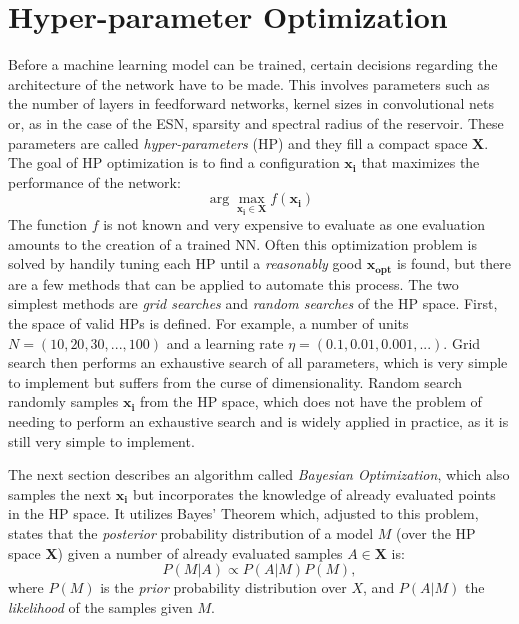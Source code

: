 \section{Hyper-parameter Optimization}%
\label{sec:hyper_parameter_optimization}

Before a machine learning model can be trained, certain decisions regarding the
architecture of the network have to be made. This involves parameters such as
the number of layers in feedforward networks, kernel sizes in
convolutional nets or, as in the case of the ESN, sparsity and spectral radius
of the reservoir.  These parameters are called \emph{hyper-parameters} (HP) and
they fill a compact space $\mathbf{X}$.  The goal of HP optimization is to find
a configuration $\mathbf{x_i}$ that maximizes the performance of the network:
\begin{equation}
  \arg \max_{\mathbf{x_i} \in \mathbf{X}} f(\mathbf{x_i})
\end{equation}
The function $f$ is not known and very expensive to evaluate as one evaluation
amounts to the creation of a trained NN.  Often this optimization problem is
solved by handily tuning each HP until a \emph{reasonably} good
$\mathbf{x_{\text{opt}}}$ is found, but there are a few methods that can be
applied to automate this process.  The two simplest methods are \emph{grid
searches} and \emph{random searches} of the HP space.  First, the space of
valid HPs is defined.  For example, a number of units $N = (10, 20, 30,...,
100)$ and a learning rate $\eta = (0.1, 0.01, 0.001, ...)$. Grid search then
performs an exhaustive search of all parameters, which is very simple to
implement but suffers from the curse of dimensionality.  Random search randomly
samples $\mathbf{x_i}$ from the HP space, which does not have the problem of
needing to perform an exhaustive search and is widely applied in practice, as
it is still very simple to implement.

The next section describes an algorithm called \emph{Bayesian Optimization},
which also samples the next $\mathbf{x_i}$ but incorporates the knowledge of
already evaluated points in the HP space.  It utilizes Bayes' Theorem which,
adjusted to this problem, states that the \emph{posterior} probability
distribution of a model $M$ (over the HP space $\mathbf{X}$) given a number of
already evaluated samples $A \in \mathbf{X}$ is:
\begin{equation}
  P(M|A) \propto P(A|M) P(M),
\end{equation}
where $P(M)$ is the \emph{prior} probability distribution over $X$, and
$P(A|M)$ the \emph{likelihood} of the samples given $M$.


